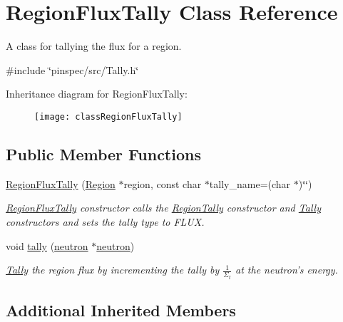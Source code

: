 \hypertarget{classRegionFluxTally}{\section{Region\-Flux\-Tally Class Reference}
\label{classRegionFluxTally}
}


A class for tallying the flux for a region.  




{\ttfamily \#include \char`\"{}pinspec/src/\-Tally.\-h\char`\"{}}

Inheritance diagram for Region\-Flux\-Tally\-:\begin{figure}[H]
\begin{center}
\leavevmode
\texttt{[image: classRegionFluxTally]}
\end{center}
\end{figure}
\subsection*{Public Member Functions}
\begin{DoxyCompactItemize}
\item 
\hyperlink{classRegionFluxTally_afeb527c4b8deafc6cff68594ad95a9c8}{Region\-Flux\-Tally} (\hyperlink{classRegion}{Region} $\ast$region, const char $\ast$tally\-\_\-name=(char $\ast$)\char`\"{}\char`\"{})
\begin{DoxyCompactList}\small\item\em \hyperlink{classRegionFluxTally}{Region\-Flux\-Tally} constructor calls the \hyperlink{classRegionTally}{Region\-Tally} constructor and \hyperlink{classTally}{Tally} constructors and sets the tally type to F\-L\-U\-X. \end{DoxyCompactList}\item 
void \hyperlink{classRegionFluxTally_a318a32edcb4f2866574194cd74ddd04f}{tally} (\hyperlink{structneutron}{neutron} $\ast$\hyperlink{structneutron}{neutron})
\begin{DoxyCompactList}\small\item\em \hyperlink{classTally}{Tally} the region flux by incrementing the tally by $ \frac{1}{\Sigma_t} $ at the neutron's energy. \end{DoxyCompactList}\end{DoxyCompactItemize}
\subsection*{Additional Inherited Members}


